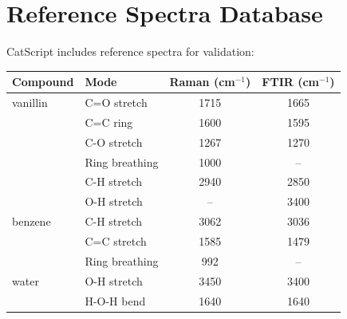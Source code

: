 \documentclass[twocolumn,10pt]{article}
\begin{document}
\section{Reference Spectra Database}

CatScript includes reference spectra for validation:

\begin{table}[H]
\centering
\small
\begin{tabular}{@{}llcc@{}}
\toprule
Compound & Mode & Raman (cm$^{-1}$) & FTIR (cm$^{-1}$) \\
\midrule
vanillin & C=O stretch & 1715 & 1665 \\
         & C=C ring & 1600 & 1595 \\
         & C-O stretch & 1267 & 1270 \\
         & Ring breathing & 1000 & -- \\
         & C-H stretch & 2940 & 2850 \\
         & O-H stretch & -- & 3400 \\
\midrule
benzene  & C-H stretch & 3062 & 3036 \\
         & C=C stretch & 1585 & 1479 \\
         & Ring breathing & 992 & -- \\
\midrule
water    & O-H stretch & 3450 & 3400 \\
         & H-O-H bend & 1640 & 1640 \\
\bottomrule
\end{tabular}
\end{table}
\end{document}
